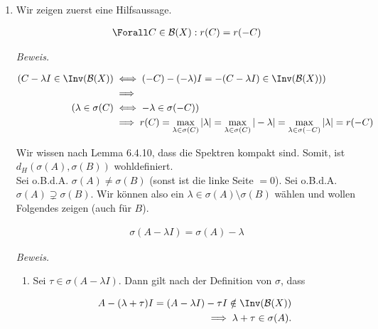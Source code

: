 \begin{solution}

\phantom{}

\begin{enumerate}[label = (\alph*)]

  \item
  Wir zeigen zuerst eine Hilfsaussage.

  \begin{align} \label{Lemmachen}
    \Forall C \in \mathcal{B}(X):
    r(C) = r(-C)
  \end{align}

  \textit{Beweis.}

  \begin{align*}
    (
      C - \lambda I \in \Inv(\mathcal{B}(X))
      & \iff
      (-C) - (-\lambda) I = -(C - \lambda I) \in \Inv(\mathcal{B}(X))
    ) \\
    & \implies \\
    (
      \lambda \in \sigma (C)
      & \iff
      -\lambda \in \sigma (-C)
    ) \\
    & \implies
    r(C) = \max_{\lambda \in \sigma (C)} |\lambda| = \max_{\lambda \in \sigma (C)} |-\lambda| =
    \max_{\lambda \in \sigma (-C)} |\lambda| = r(-C)
  \end{align*}


  Wir wissen nach Lemma 6.4.10, dass die Spektren kompakt sind.
  Somit, ist $d_H(\sigma(A), \sigma(B))$ wohldefiniert. \\

  Sei o.B.d.A. $\sigma(A) \neq \sigma(B)$ (sonst ist die linke Seite $=0$).
  Sei o.B.d.A. $\sigma(A) \supsetneq \sigma(B)$.
  Wir können also ein $\lambda \in \sigma(A) \setminus \sigma(B)$ wählen und wollen Folgendes zeigen (auch für $B$).

  \begin{align} \label{minuslambda}
    \sigma(A-\lambda I) = \sigma(A) - \lambda
  \end{align}

  \textit{Beweis.}

  \begin{enumerate}[label = \arabic*.]

    \item
    Sei $\tau \in \sigma(A-\lambda I)$. Dann gilt nach der Definition von $\sigma$, dass

    \begin{align*}
      A - (\lambda + \tau) I
      =
      (A - \lambda I) - \tau I
      \notin
      \Inv(\mathcal{B}(X)) \\
      \implies
      \lambda + \tau \in \sigma(A).
    \end{align*}


\end{enumerate}
\end{enumerate}
\end{solution}
